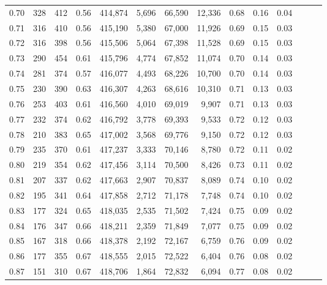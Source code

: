 \begin{tabular}{rrrrrrrrrrrrrr}
0.70 &     328 &    412 &  0.56 &  414,874 &    5,696 &  66,590 &  12,336 &  0.68 &  0.16 &      0.04 \\
0.71 &     316 &    410 &  0.56 &  415,190 &    5,380 &  67,000 &  11,926 &  0.69 &  0.15 &      0.03 \\
0.72 &     316 &    398 &  0.56 &  415,506 &    5,064 &  67,398 &  11,528 &  0.69 &  0.15 &      0.03 \\
0.73 &     290 &    454 &  0.61 &  415,796 &    4,774 &  67,852 &  11,074 &  0.70 &  0.14 &      0.03 \\
0.74 &     281 &    374 &  0.57 &  416,077 &    4,493 &  68,226 &  10,700 &  0.70 &  0.14 &      0.03 \\
0.75 &     230 &    390 &  0.63 &  416,307 &    4,263 &  68,616 &  10,310 &  0.71 &  0.13 &      0.03 \\
0.76 &     253 &    403 &  0.61 &  416,560 &    4,010 &  69,019 &   9,907 &  0.71 &  0.13 &      0.03 \\
0.77 &     232 &    374 &  0.62 &  416,792 &    3,778 &  69,393 &   9,533 &  0.72 &  0.12 &      0.03 \\
0.78 &     210 &    383 &  0.65 &  417,002 &    3,568 &  69,776 &   9,150 &  0.72 &  0.12 &      0.03 \\
0.79 &     235 &    370 &  0.61 &  417,237 &    3,333 &  70,146 &   8,780 &  0.72 &  0.11 &      0.02 \\
0.80 &     219 &    354 &  0.62 &  417,456 &    3,114 &  70,500 &   8,426 &  0.73 &  0.11 &      0.02 \\
0.81 &     207 &    337 &  0.62 &  417,663 &    2,907 &  70,837 &   8,089 &  0.74 &  0.10 &      0.02 \\
0.82 &     195 &    341 &  0.64 &  417,858 &    2,712 &  71,178 &   7,748 &  0.74 &  0.10 &      0.02 \\
0.83 &     177 &    324 &  0.65 &  418,035 &    2,535 &  71,502 &   7,424 &  0.75 &  0.09 &      0.02 \\
0.84 &     176 &    347 &  0.66 &  418,211 &    2,359 &  71,849 &   7,077 &  0.75 &  0.09 &      0.02 \\
0.85 &     167 &    318 &  0.66 &  418,378 &    2,192 &  72,167 &   6,759 &  0.76 &  0.09 &      0.02 \\
0.86 &     177 &    355 &  0.67 &  418,555 &    2,015 &  72,522 &   6,404 &  0.76 &  0.08 &      0.02 \\
0.87 &     151 &    310 &  0.67 &  418,706 &    1,864 &  72,832 &   6,094 &  0.77 &  0.08 &      0.02 \\

\end{tabular}
